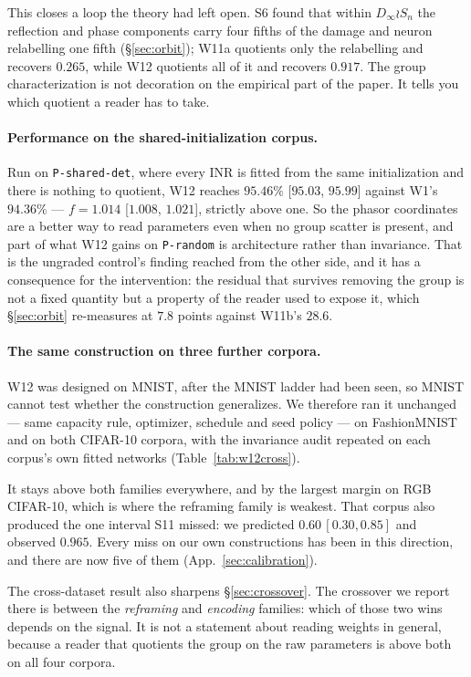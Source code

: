 \documentclass[10pt,twocolumn,letterpaper]{article}
\theoremstyle{definition}
\newcommand{\Dinf}{D_\infty}
\begin{document}
This closes a loop the theory had left open. S6 found that within $\Dinf\wr S_n$ the reflection and
phase components carry four fifths of the damage and neuron relabelling one fifth
(\S\ref{sec:orbit}); W11a quotients only the relabelling and recovers $0.265$, while W12 quotients
all of it and recovers $0.917$. The group characterization is not decoration on the empirical part of the paper. It tells you which quotient a reader has to take.

\paragraph{Performance on the shared-initialization corpus.} Run on
\texttt{P-shared-det}, where every INR is fitted from the same initialization and there is nothing
to quotient, W12 reaches $95.46\%$ [$95.03$, $95.99$] against W1's $94.36\%$ --- $f = 1.014$
[$1.008$, $1.021$], strictly above one. So the phasor coordinates are a better way to read
parameters even when no group scatter is present, and part of what W12 gains on \texttt{P-random} is
architecture rather than invariance. That is the ungraded control's finding reached from the other
side, and it has a consequence for the intervention: the residual that survives removing the group
is not a fixed quantity but a property of the reader used to expose it, which \S\ref{sec:orbit}
re-measures at $7.8$ points against W11b's $28.6$.

\paragraph{The same construction on three further corpora.} W12 was designed on MNIST, after the
MNIST ladder had been seen, so MNIST cannot test whether the construction generalizes. We therefore
ran it unchanged --- same capacity rule, optimizer, schedule and seed policy --- on FashionMNIST
and on both CIFAR-10 corpora, with the invariance audit repeated on each corpus's own fitted
networks (Table~\ref{tab:w12cross}).



\noindent It stays above both families everywhere, and by the largest margin on RGB CIFAR-10,
which is where the reframing family is weakest. That corpus also produced the one interval S11 missed: we predicted $0.60\,[0.30,0.85]$ and
observed $0.965$. Every miss on our own constructions has been in this direction, and there are now
five of them (App.~\ref{sec:calibration}).

The cross-dataset result also sharpens \S\ref{sec:crossover}. The crossover we report there is
between the \emph{reframing} and \emph{encoding} families: which of those two wins depends on the
signal. It is not a statement about reading weights in general, because a reader that quotients the
group on the raw parameters is above both on all four corpora.
\end{document}
